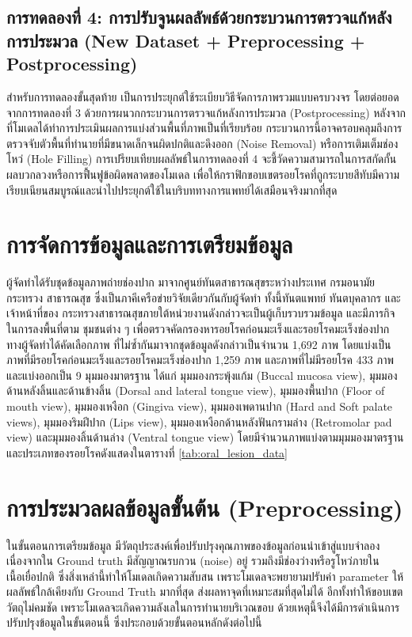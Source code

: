 \subsection{การทดลองที่ 4: การปรับจูนผลลัพธ์ด้วยกระบวนการตรวจแก้หลังการประมวล (New Dataset + Preprocessing + Postprocessing)}
สำหรับการทดลองขั้นสุดท้าย เป็นการประยุกต์ใช้ระเบียบวิธีจัดการภาพรวมแบบครบวงจร โดยต่อยอดจากการทดลองที่ 3 ด้วยการผนวกกระบวนการตรวจแก้หลังการประมวล (Postprocessing) หลังจากที่โมเดลได้ทำการประเมินผลการแบ่งส่วนพื้นที่ภาพเป็นที่เรียบร้อย กระบวนการนี้อาจครอบคลุมถึงการตรวจจับตัวพื้นที่ทำนายที่มีขนาดเล็กจนผิดปกติและดึงออก (Noise Removal) หรือการเติมเต็มช่องโหว่ (Hole Filling) การเปรียบเทียบผลลัพธ์ในการทดลองที่ 4 จะชี้วัดความสามารถในการสกัดกั้นผลบวกลวงหรือการฟื้นฟูข้อผิดพลาดของโมเดล เพื่อให้กราฟิกขอบเขตรอยโรคที่ถูกระบายสีทับมีความเรียบเนียนสมบูรณ์และนำไปประยุกต์ใช้ในบริบททางการแพทย์ได้เสมือนจริงมากที่สุด



\section{การจัดการข้อมูลและการเตรียมข้อมูล}
ผู้จัดทําได้รับชุดข้อมูลภาพถ่ายช่องปาก มาจากศูนย์ทันตสาธารณสุขระหว่างประเทศ กรมอนามัย กระทรวง
สาธารณสุข ซึ่งเป็นภาคีเครือข่ายวิจัยเดียวกันกับผู้จัดทํา ทั้งนี้ทันตแพทย์ ทันตบุคลากร และเจ้าหน้าที่ของ
กระทรวงสาธารณสุขภายใต้หน่วยงานดังกล่าวจะเป็นผู้เก็บรวบรวมข้อมูล และมีภารกิจในการลงพื้นที่ตาม
ชุมชนต่าง ๆ เพื่อตรวจคัดกรองหารอยโรคก่อนมะเร็งและรอยโรคมะเร็งช่องปาก ทางผู้จัดทําได้คัดเลือกภาพ
ที่ไม่ซํ้ากันมาจากชุดข้อมูลดังกล่าวเป็นจํานวน 1,692 ภาพ โดยแบ่งเป็นภาพที่มีรอยโรคก่อนมะเร็งและรอยโรคมะเร็งช่องปาก 1,259 ภาพ และภาพที่ไม่มีรอยโรค 433 ภาพ และแบ่งออกเป็น 9 มุมมองมาตรฐาน ได้แก่ มุมมองกระพุ้งแก้ม (Buccal mucosa view), มุมมองด้านหลังลิ้นและด้านข้างลิ้น (Dorsal and lateral tongue view), มุมมองพื้นปาก (Floor of mouth view), มุมมองเหงือก (Gingiva view), มุมมองเพดานปาก (Hard and Soft palate views), มุมมองริมฝีปาก (Lips view), มุมมองเหงือกด้านหลังฟันกรามล่าง (Retromolar pad view) และมุมมองลิ้นด้านล่าง (Ventral tongue view) โดยมีจำนวนภาพแบ่งตามมุมมองมาตรฐานและประเภทของรอยโรคดังแสดงในตารางที่ \ref{tab:oral_lesion_data}



\section{การประมวลผลข้อมูลขั้นต้น (Preprocessing)}

ในขั้นตอนการเตรียมข้อมูล มีวัตถุประสงค์เพื่อปรับปรุงคุณภาพของข้อมูลก่อนนำเข้าสู่แบบจำลอง เนื่องจากใน Ground truth มีสัญญาณรบกวน (noise) อยู่ รวมถึงมีช่องว่างหรือรูโหว่ภายในเนื้อเยื่อปกติ ซึ่งสิ่งเหล่านี้ทำให้โมเดลเกิดความสับสน เพราะโมเดลจะพยายามปรับค่า parameter ให้ผลลัพธ์ใกล้เคียงกับ Ground Truth มากที่สุด ส่งผลหาจุดที่เหมาะสมที่สุดไม่ได้ อีกทั้งทำให้ขอบเขตวัตถุไม่คมชัด เพราะโมเดลจะเกิดความลังเลในการทำนายบริเวณขอบ ด้วยเหตุนี้จึงได้มีการดำเนินการปรับปรุงข้อมูลในขั้นตอนนี้ ซึ่งประกอบด้วยขั้นตอนหลักดังต่อไปนี้

